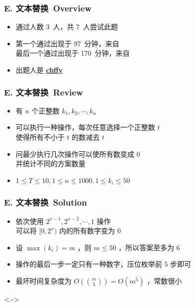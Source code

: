 \documentclass[notheorems]{beamer}
\newcommand{\zhProbE}{文本替换}		\newcommand{\AuthProbE}{\textbf{\underline{\href{http://codeforces.com/profile/chffy}{chffy}}}}
\newcommand{\AccInProbE}{3}	\newcommand{\SubInProbE}{7}	\newcommand{\RatInProbE}{42.86\%}
\newcommand{\FirPenInProbE}{97}		\newcommand{\FirPerInProbE}{\NONE}
\newcommand{\LasPenInProbE}{170}	\newcommand{\LasPerInProbE}{\NONE}
\begin{document}
\begin{frame}[label = ProbE]
\frametitle{E. \zhProbE\ Overview}
\begin{spacing}{2.0} \large
\begin{itemize}[<+->]
\item 通过人数 \AccInProbE\ 人，共 \SubInProbE\ 人尝试此题
\item 第一个通过出现于 \FirPenInProbE\ 分钟，来自 \FirPerInProbE\ 
\\ 最后一个通过出现于 \LasPenInProbE\ 分钟，来自 \LasPerInProbE\ 
\item 出题人是 \AuthProbE\ 
\end{itemize}
\end{spacing}
\end{frame}
\begin{frame}
\frametitle{E. \zhProbE\ Review}
\begin{spacing}{2.0} \large
\begin{itemize}[<+->]
\item 有 $n$ 个正整数 $k_1, k_2, \cdots, k_n$
\item 可以执行一种操作，每次任意选择一个正整数 $t$ \\ 使得所有不小于 $t$ 的数减去 $t$
\item 问最少执行几次操作可以使所有数变成 $0$ \\ 并统计\alert{不同的方案}数量
\item $1 \leq T \leq 10, 1 \leq n \leq 1000, 1 \leq k_i \leq 50$
\end{itemize}
\end{spacing}
\end{frame}
\begin{frame}
\frametitle{E. \zhProbE\ Solution}
\begin{spacing}{2.0} \large
\begin{itemize}[<+->]
\item 依次使用 $2^{x-1},2^{x-2}, \cdots, 1$ 操作 \\ 可以将 $[0, 2^x)$ 内的所有数字变为 $0$ 
\item 设 $\max(k_i) = m$ ，则 $m \leq 50$ ，所以\alert{答案至多为 $6$}
\item 操作的最后一步一定只有一种数字，压位\alert{枚举前 $5$ 步即可}
\item 最坏时间复杂度为 $\displaystyle{O(\binom{m}{5}) = O(m^5)}$ ，常数很小
\end{itemize}
\end{spacing}
\visible<.->{\hyperlink{Overview}{\beamerreturnbutton{Go Back}}}
\end{frame}
\end{document}
